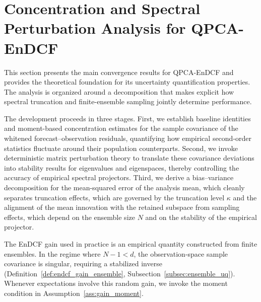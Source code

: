 \documentclass[11pt,a4paper]{article}
\begin{document}




\FloatBarrier


\section{Concentration and Spectral Perturbation Analysis for QPCA-EnDCF}
\label{sec:concentration_spectral}

This section presents the main convergence results for QPCA-EnDCF and provides the theoretical foundation for its uncertainty quantification properties. The analysis is organized around a decomposition that makes explicit how spectral truncation and finite-ensemble sampling jointly determine performance.

The development proceeds in three stages. First, we establish baseline identities and moment-based concentration estimates for the sample covariance of the whitened forecast--observation residuals, quantifying how empirical second-order statistics fluctuate around their population counterparts. Second, we invoke deterministic matrix perturbation theory to translate these covariance deviations into stability results for eigenvalues and eigenspaces, thereby controlling the accuracy of empirical spectral projectors. Third, we derive a bias--variance decomposition for the mean-squared error of the analysis mean, which cleanly separates truncation effects, which are governed by the truncation level $\kappa$ and the alignment of the mean innovation with the retained subspace from sampling effects, which depend on the ensemble size $N$ and on the stability of the empirical projector.

The EnDCF gain used in practice is an empirical quantity constructed from finite ensembles. In the regime where $N-1<d$, the observation-space sample covariance is singular, requiring a stabilized inverse (Definition~\ref{def:endcf_gain_ensemble}, Subsection~\ref{subsec:ensemble_uq}). Whenever expectations involve this random gain, we invoke the moment condition in Assumption~\ref{ass:gain_moment}.
\end{document}
